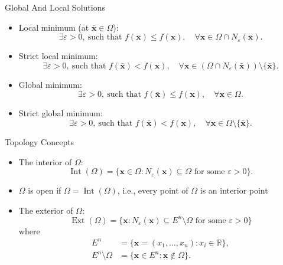 \documentclass[aspectratio=169,hyperref,UTF8,CJK]{beamer}
\newcommand{\R}{\mathbb{R}}
\newcommand{\vect}[1]{\boldsymbol{#1}}
\begin{document}
\begin{frame}{Global And Local Solutions}
  \small
  \begin{itemize}
    \item Local minimum (at $\bar{\vect{x}}\in\Omega$):
      \begin{equation*}
        \exists\varepsilon>0,\ \text{such that }f(\bar{\vect{x}})\le f(\vect{x}),\quad
        \forall\vect{x}\in\Omega\cap N_{\varepsilon}(\bar{\vect{x}}).
      \end{equation*}
    \item Strict local minimum:
      \begin{equation*}
        \exists\varepsilon>0,\ \text{such that }f(\bar{\vect{x}})<f(\vect{x}),\quad
        \forall\vect{x}\in(\Omega\cap N_{\varepsilon}(\bar{\vect{x}}))\setminus\{\bar{\vect{x}}\}.
      \end{equation*}
    \item Global minimum:
      \begin{equation*}
         \exists\varepsilon>0,\ \text{such that }f(\bar{\vect{x}})\le f(\vect{x}),\quad\forall\vect{x}\in\Omega.
      \end{equation*}
    \item Strict global minimum:
      \begin{equation*}
         \exists\varepsilon>0,\ \text{such that }f(\bar{\vect{x}})<f(\vect{x}),\quad\forall\vect{x}\in\Omega\setminus\{\bar{\vect{x}}\}.
      \end{equation*}
  \end{itemize}
\end{frame}

\begin{frame}{Topology Concepts}
  \small
  \begin{itemize}
    \item The interior of $\Omega$:
      \begin{equation*}
        \operatorname{Int}(\Omega)=\{\vect{x}\in\Omega:N_{\varepsilon}(\vect{x})\subseteq\Omega\text{ for some }\varepsilon>0\}.
      \end{equation*}
    \item $\Omega$ is open if $\Omega=\operatorname{Int}(\Omega)$, i.e., every point of $\Omega$ is an interior point
    \item The exterior of $\Omega$:
      \begin{equation*}
        \operatorname{Ext}(\Omega)=\{\vect{x}:N_{\varepsilon}(\vect{x})\subseteq E^n\setminus\Omega\text{ for some }\varepsilon>0\}
      \end{equation*}
      where
      \begin{align*}
        E^n&=\{\vect{x}=(x_1,\ldots,x_n):x_i\in\R\},\\
        E^n\setminus\Omega&=\{\vect{x}\in E^n:\vect{x}\notin\Omega\}.
      \end{align*}
  \end{itemize}
\end{frame}
\end{document}

